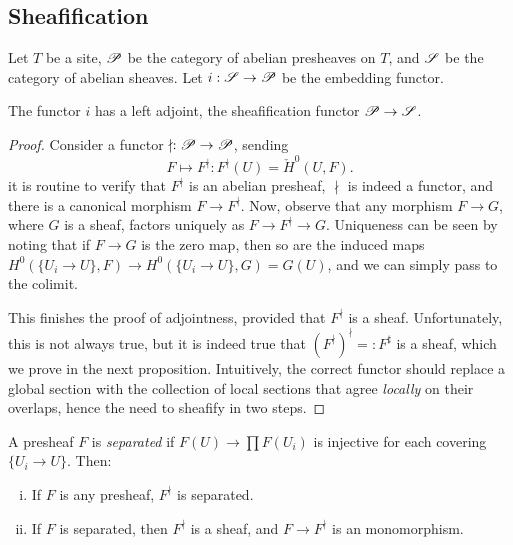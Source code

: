\documentclass[11pt]{amsart}
\begin{document}
\subsection{Sheafification}

Let $T$ be a site, $\mathscr{P}$ be the category of abelian presheaves on $T$, and $\mathscr{S}$ be the category of abelian sheaves. Let $i:\mathscr{S}\to \mathscr{P}$ be the embedding functor.

\begin{thm}
    The functor $i$ has a left adjoint, the sheafification functor $\mathscr{P}\to \mathscr{S}$.
\end{thm}

\begin{proof}
    Consider a functor $\nmid: \mathscr{P}\to \mathscr{P}$, sending
    \[F\mapsto F^{\nmid}: F^{\nmid}(U) = \check{H}^0(U, F).\]
    it is routine to verify that $F^{\nmid}$ is an abelian presheaf, $\nmid$ is indeed a functor, and there is a canonical morphism $F\to F^{\nmid}$. Now, observe that any morphism $F\to G$, where $G$ is a sheaf, factors uniquely as $F\to F^{\nmid}\to G$. Uniqueness can be seen by noting that if $F\to G$ is the zero map, then so are the induced maps $H^0(\{U_i\to U\}, F) \to H^0(\{U_i\to U\}, G) = G(U)$, and we can simply pass to the colimit.

    This finishes the proof of adjointness, provided that $F^{\nmid}$ is a sheaf. Unfortunately, this is not always true, but it is indeed true that $(F^{\nmid})^{\nmid} =: F^\sharp$ is a sheaf, which we prove in the next proposition. Intuitively, the correct functor should replace a global section with the collection of local sections that agree \emph{locally} on their overlaps, hence the need to sheafify in two steps.
\end{proof}



\begin{prop}
     A presheaf $F$ is \emph{separated} if $F(U)\to \prod F(U_i)$ is injective for each covering $\{U_i\to U\}$. Then:
     \begin{enumerate}[(i)]
         \item If $F$ is any presheaf, $F^{\nmid}$ is separated.
         \item If $F$ is separated, then $F^{\nmid}$ is a sheaf, and $F\to F^{\nmid}$ is an monomorphism.
     \end{enumerate}
\end{prop}
\end{document}
